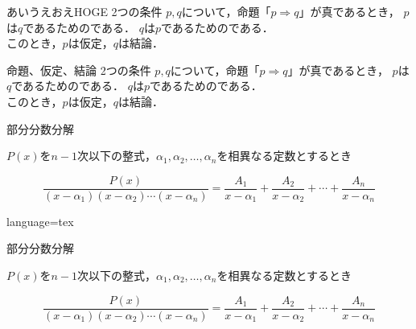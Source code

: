 \documentclass[../main]{subfiles}
\begin{document}
\begin{Note}[type=left,colback=cyan]{あいうえおえHOGE}
    2つの条件 $p,q$について，命題「$p \Rightarrow q$」が真であるとき，
    $p$は$q$であるためのである．
    $q$は$p$であるためのである． \\
    このとき，$p$は仮定，$q$は結論．
\end{Note}

\begin{Note}[type=invleft]{命題、仮定、結論}
    2つの条件 $p,q$について，命題「$p \Rightarrow q$」が真であるとき，
    $p$は$q$であるためのである．
    $q$は$p$であるためのである． \\
    このとき，$p$は仮定，$q$は結論．
\end{Note}

\HRuleLeader

\begin{Note}{部分分数分解}

$P(x)$を$n-1$次以下の整式，$\alpha_1,\alpha_2,\ldots,\alpha_n$を相異なる定数とするとき

\begin{equation*}
    \frac{P(x)}{(x-\alpha_1)(x-\alpha_2)\cdots(x-\alpha_n)}
    = \frac{A_1}{x-\alpha_1} + \frac{A_2}{x-\alpha_2} + \cdots + \frac{A_n}{x-\alpha_n}
\end{equation*}

\end{Note}
\begin{Code}{language=tex}
\begin{Note}{部分分数分解}

    $P(x)$を$n-1$次以下の整式，$\alpha_1,\alpha_2,\ldots,\alpha_n$を相異なる定数とするとき

    \begin{equation*}
        \frac{P(x)}{(x-\alpha_1)(x-\alpha_2)\cdots(x-\alpha_n)}
        = \frac{A_1}{x-\alpha_1} + \frac{A_2}{x-\alpha_2} + \cdots + \frac{A_n}{x-\alpha_n}
    \end{equation*}

\end{Note}
\end{Code}
\end{document}
